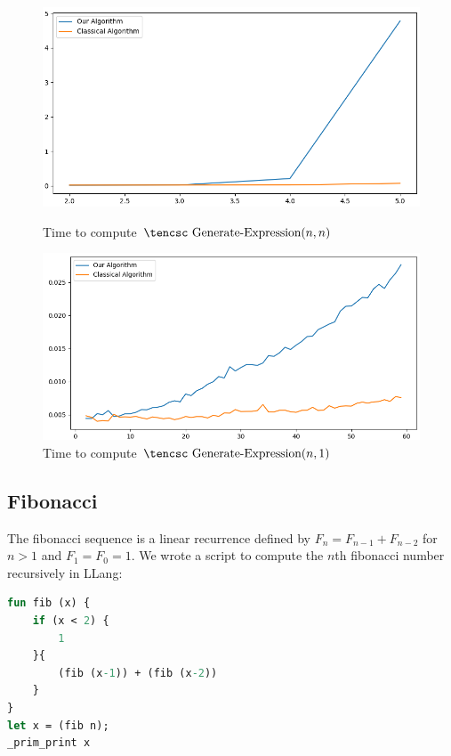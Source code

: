 \documentclass{llncs}
\begin{document}
\begin{figure}

    \centerline{\includegraphics[width=\hsize]{../Docs/Images/expr.png}}
    \caption{Time to compute $\hbox{\tencsc Generate-Expression}(n,n)$}
    \label{fig:expr1}
    \medskip
    \centerline{\includegraphics[width=\hsize]{../Docs/Images/expr1.png}}
    \caption{Time to compute $\hbox{\tencsc Generate-Expression}(n,1)$}
    \label{fig:expr2}

\end{figure}

\subsection{Fibonacci}

The fibonacci sequence is a linear recurrence defined by $F_n=F_{n-1}+F_{n-2}$ for $n>1$ and $F_1=F_0=1$.
We wrote a script to compute the $n$th fibonacci number recursively in LLang:

\begin{lstlisting}[language=Caml, frame=single]
fun fib (x) {
    if (x < 2) {
        1
    }{
        (fib (x-1)) + (fib (x-2))
    }
}
let x = (fib n);
_prim_print x
\end{lstlisting}
\end{document}
